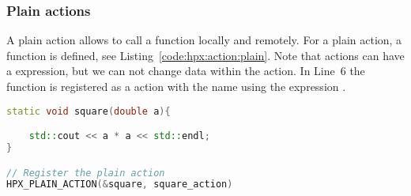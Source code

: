 \subsubsection{Plain actions}
A plain action allows to call a  function locally and remotely. For a plain action, a  function   is defined, see Listing~\ref{code:hpx:action:plain}. Note that actions can have a  expression, but we can not change data within the action. In Line~6 the function  is registered as a action with the name  using the expression .

\begin{lstlisting}[language=c++,caption={Plain actions in HPX.\label{code:hpx:action:plain}},float,floatplacement=tb]
static void square(double a){

	std::cout << a * a << std::endl;
}

// Register the plain action
HPX_PLAIN_ACTION(&square, square_action)
\end{lstlisting}

